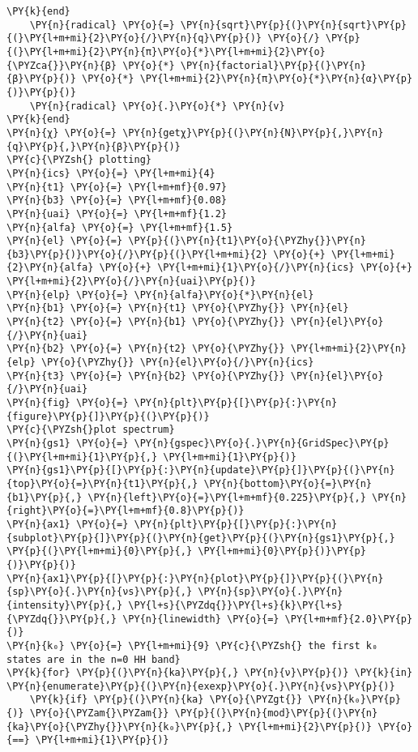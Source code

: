 \begin{Verbatim}[commandchars=\\\{\}]
    \PY{k}{end}
    \PY{n}{radical} \PY{o}{=} \PY{n}{sqrt}\PY{p}{(}\PY{n}{sqrt}\PY{p}{(}\PY{l+m+mi}{2}\PY{o}{/}\PY{n}{q}\PY{p}{)} \PY{o}{/} \PY{p}{(}\PY{l+m+mi}{2}\PY{n}{π}\PY{o}{*}\PY{l+m+mi}{2}\PY{o}{\PYZca{}}\PY{n}{β} \PY{o}{*} \PY{n}{factorial}\PY{p}{(}\PY{n}{β}\PY{p}{)} \PY{o}{*} \PY{l+m+mi}{2}\PY{n}{π}\PY{o}{*}\PY{n}{α}\PY{p}{)}\PY{p}{)}
    \PY{n}{radical} \PY{o}{.}\PY{o}{*} \PY{n}{v}
\PY{k}{end}
\PY{n}{χ} \PY{o}{=} \PY{n}{getχ}\PY{p}{(}\PY{n}{N}\PY{p}{,}\PY{n}{q}\PY{p}{,}\PY{n}{β}\PY{p}{)}
\PY{c}{\PYZsh{} plotting}
\PY{n}{ics} \PY{o}{=} \PY{l+m+mi}{4}
\PY{n}{t1} \PY{o}{=} \PY{l+m+mf}{0.97}
\PY{n}{b3} \PY{o}{=} \PY{l+m+mf}{0.08}
\PY{n}{uai} \PY{o}{=} \PY{l+m+mf}{1.2}
\PY{n}{alfa} \PY{o}{=} \PY{l+m+mf}{1.5}
\PY{n}{el} \PY{o}{=} \PY{p}{(}\PY{n}{t1}\PY{o}{\PYZhy{}}\PY{n}{b3}\PY{p}{)}\PY{o}{/}\PY{p}{(}\PY{l+m+mi}{2} \PY{o}{+} \PY{l+m+mi}{2}\PY{n}{alfa} \PY{o}{+} \PY{l+m+mi}{1}\PY{o}{/}\PY{n}{ics} \PY{o}{+} \PY{l+m+mi}{2}\PY{o}{/}\PY{n}{uai}\PY{p}{)}
\PY{n}{elp} \PY{o}{=} \PY{n}{alfa}\PY{o}{*}\PY{n}{el}
\PY{n}{b1} \PY{o}{=} \PY{n}{t1} \PY{o}{\PYZhy{}} \PY{n}{el}
\PY{n}{t2} \PY{o}{=} \PY{n}{b1} \PY{o}{\PYZhy{}} \PY{n}{el}\PY{o}{/}\PY{n}{uai}
\PY{n}{b2} \PY{o}{=} \PY{n}{t2} \PY{o}{\PYZhy{}} \PY{l+m+mi}{2}\PY{n}{elp} \PY{o}{\PYZhy{}} \PY{n}{el}\PY{o}{/}\PY{n}{ics}
\PY{n}{t3} \PY{o}{=} \PY{n}{b2} \PY{o}{\PYZhy{}} \PY{n}{el}\PY{o}{/}\PY{n}{uai}
\PY{n}{fig} \PY{o}{=} \PY{n}{plt}\PY{p}{[}\PY{p}{:}\PY{n}{figure}\PY{p}{]}\PY{p}{(}\PY{p}{)}
\PY{c}{\PYZsh{}plot spectrum}
\PY{n}{gs1} \PY{o}{=} \PY{n}{gspec}\PY{o}{.}\PY{n}{GridSpec}\PY{p}{(}\PY{l+m+mi}{1}\PY{p}{,} \PY{l+m+mi}{1}\PY{p}{)}
\PY{n}{gs1}\PY{p}{[}\PY{p}{:}\PY{n}{update}\PY{p}{]}\PY{p}{(}\PY{n}{top}\PY{o}{=}\PY{n}{t1}\PY{p}{,} \PY{n}{bottom}\PY{o}{=}\PY{n}{b1}\PY{p}{,} \PY{n}{left}\PY{o}{=}\PY{l+m+mf}{0.225}\PY{p}{,} \PY{n}{right}\PY{o}{=}\PY{l+m+mf}{0.8}\PY{p}{)}
\PY{n}{ax1} \PY{o}{=} \PY{n}{plt}\PY{p}{[}\PY{p}{:}\PY{n}{subplot}\PY{p}{]}\PY{p}{(}\PY{n}{get}\PY{p}{(}\PY{n}{gs1}\PY{p}{,} \PY{p}{(}\PY{l+m+mi}{0}\PY{p}{,} \PY{l+m+mi}{0}\PY{p}{)}\PY{p}{)}\PY{p}{)}
\PY{n}{ax1}\PY{p}{[}\PY{p}{:}\PY{n}{plot}\PY{p}{]}\PY{p}{(}\PY{n}{sp}\PY{o}{.}\PY{n}{νs}\PY{p}{,} \PY{n}{sp}\PY{o}{.}\PY{n}{intensity}\PY{p}{,} \PY{l+s}{\PYZdq{}}\PY{l+s}{k}\PY{l+s}{\PYZdq{}}\PY{p}{,} \PY{n}{linewidth} \PY{o}{=} \PY{l+m+mf}{2.0}\PY{p}{)}
\PY{n}{k₀} \PY{o}{=} \PY{l+m+mi}{9} \PY{c}{\PYZsh{} the first k₀ states are in the n=0 HH band}
\PY{k}{for} \PY{p}{(}\PY{n}{ka}\PY{p}{,} \PY{n}{ν}\PY{p}{)} \PY{k}{in} \PY{n}{enumerate}\PY{p}{(}\PY{n}{exexp}\PY{o}{.}\PY{n}{νs}\PY{p}{)}
    \PY{k}{if} \PY{p}{(}\PY{n}{ka} \PY{o}{\PYZgt{}} \PY{n}{k₀}\PY{p}{)} \PY{o}{\PYZam{}\PYZam{}} \PY{p}{(}\PY{n}{mod}\PY{p}{(}\PY{n}{ka}\PY{o}{\PYZhy{}}\PY{n}{k₀}\PY{p}{,} \PY{l+m+mi}{2}\PY{p}{)} \PY{o}{==} \PY{l+m+mi}{1}\PY{p}{)}

\end{Verbatim}
